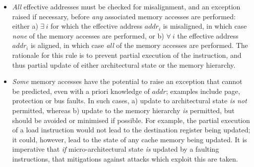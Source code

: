 \begin{itemize}

\item {\em All} effective addresses must be checked for misalignment, and
      an exception raised if necessary, before {\em any} associated memory 
      accesses are performed: either
      a) $\exists~i$ for which the effective address $addr_i$ is misaligned, 
         in which case {\em none} of the memory accesses are performed,
         or
      b) $\forall~i$           the effective address $addr_i$ is    aligned, 
         in which case {\em  all} of the memory accesses are performed.
      The rationale for this rule is to prevent partial execution of the
      instruction, and thus partial update of either architectural state
      or the memory hierarchy.

\item {\em Some} memory accesses have the potential to raise an exception
      that cannot be predicted, even with a priori knowledge of $addr$;
      examples include page, protection or bus faults.  In such cases,
      a) update to 
         architectural state 
         {\em is not} permitted,
         whereas
      b) update to the 
         memory hierarchy
         {\em is}     permitted,
         but should be avoided or minimised if possible.
      For example, the partial execution of a load instruction would not
      lead to the destination register being updated; it could, however,
      lead to the state of any cache memory being updated.
      It is imperative that {\em if} micro-architectural state {\em is}
      updated by a faulting instructions, that mitigations against
      attacks which exploit this are taken.

\end{itemize}



